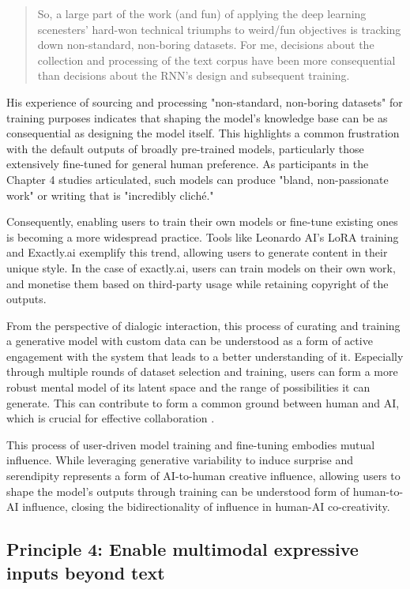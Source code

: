 \begin{quote}
    So, a large part of the work (and fun) of applying the deep learning scenesters’ hard-won technical triumphs to weird/fun objectives is tracking down non-standard, non-boring datasets. For me, decisions about the collection and processing of the text corpus have been more consequential than decisions about the RNN’s design and subsequent training.
\end{quote}


His experience of sourcing and processing "non-standard, non-boring datasets" for training purposes indicates that shaping the model's knowledge base can be as consequential as designing the model itself. This highlights a common frustration with the default outputs of broadly pre-trained models, particularly those extensively fine-tuned for general human preference. As participants in the Chapter 4 studies articulated, such models can produce "bland, non-passionate work" or writing that is "incredibly cliché."

Consequently, enabling users to train their own models or fine-tune existing ones is becoming a more widespread practice. Tools like Leonardo AI's LoRA training and Exactly.ai exemplify this trend, allowing users to generate content in their unique style. In the case of exactly.ai, users can train models on their own work, and monetise them based on third-party usage while retaining copyright of the outputs. 

From the perspective of dialogic interaction, this process of curating and training a generative model with custom data can be understood as a form of active engagement with the system that leads to a better understanding of it. Especially through multiple rounds of dataset selection and training, users can form a more robust mental model of its latent space and the range of possibilities it can generate. This can contribute to form a common ground between human and AI, which is crucial for effective collaboration \cite{Dafoe2021-in}.

This process of user-driven model training and fine-tuning embodies mutual influence. While leveraging generative variability to induce surprise and serendipity represents a form of AI-to-human creative influence, allowing users to shape the model's outputs through training can be understood form of human-to-AI influence, closing the bidirectionality of influence in human-AI co-creativity.


\subsection{Principle 4: Enable multimodal expressive inputs beyond text}


